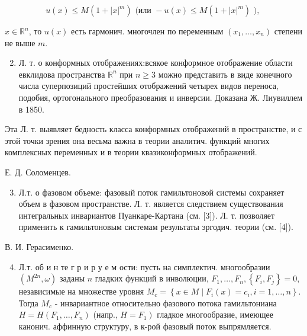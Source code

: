 \documentclass[10pt]{article}
\begin{document}
\[

u(x) \leqslant M\left(1+|x|^{m}\right) \text { (или }-u(x) \leqslant M\left(1+|x|^{m}\right) \text { ), }

\]



$x \in \mathbb{R}^{n}$, то $u(x)$ есть гармонич. многочлен по переменным $\left(x_{1}, \ldots, x_{n}\right)$ степени не выше $m$.



\begin{enumerate}

  \setcounter{enumi}{1}

  \item Л. т. о конформных отображениях:всякое конформное отображение области евклидова пространства $\mathbb{R}^{n}$ при $n \geqslant 3$ можно представить в виде конечного числа суперпозиций простейших отображений четырех видов переноса, подобия, ортогонального преобразования и инверсии. Доказана Ж. Лиувиллем в 1850.

\end{enumerate}



Эта Л. т. выявляет бедность класса конформных отображений в пространстве, и с этой точки зрения она весьма важна в теории аналитич. функций многих комплексных переменных и в теории квазиконформных отображений.



Е. Д. Соломенцев.



\begin{enumerate}

  \setcounter{enumi}{2}

  \item Л.т. о фазовом объеме: фазовый поток гамильтоновой системы сохраняет объем в фазовом пространстве. Л. т. является следствием существования интегральных инвариантов Пуанкаре-Картана (см. [3]). Л. т. позволяет применить к гамильтоновым системам результаты эргодич. теории (см. [4]).

\end{enumerate}



В. И. Герасименко.



\begin{enumerate}

  \setcounter{enumi}{3}

  \item Л.т. об и н те г р и р у е м ости: пусть на симплектич. многообразии $\left(M^{2 n}, \omega\right)$ заданы $n$ гладких функций в инволюции, $F_{1}, \ldots, F_{n},\left\{F_{i}, F_{j}\right\}=0$, независимые на множестве уровня $M_{c}=\left\{x \in M \mid F_{i}(x)=c_{i}, i=1, \ldots, n\right\}$. Тогда $M_{c}$ - инвариантное относительно фазового потока гамильтониана $H=H\left(F_{1}, \ldots, F_{n}\right)$ (напр., $\left.H=F_{1}\right)$ гладкое многообразие, имеющее канонич. аффинную структуру, в к-рой фазовый поток выпрямляется.

\end{enumerate}
\end{document}
